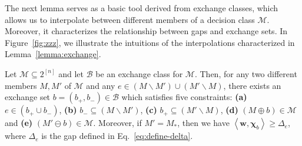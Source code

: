 \documentclass{article}
\newcommand{\M}{\mathcal M}
\newcommand{\B}{\mathcal B}
\newcommand{\del}{\backslash}
\newcommand{\inn}[1]{\left\langle #1 \right\rangle}
\renewcommand{\vec}[1]{\boldsymbol{#1}}
\begin{document}
The next lemma serves as a basic tool derived from exchange classes, which allows us to interpolate between different members of a decision class $\M$.
Moreover, it characterizes the relationship between gaps and exchange sets.
In Figure~\ref{fig:zzz}, we illustrate the intuitions of the interpolations characterized in Lemma~\ref{lemma:exchange}.
\begin{lemma}
\label{lemma:exchange}
Let $\M\subseteq 2^{[n]}$ and let $\B$ be an exchange class for $\M$.
Then, for any two different members $M,M'$ of $\M$ and any $e \in (M\del M')\cup(M'\del M)$, there exists an exchange set $b=(b_+,b_-) \in \B$ which satisfies five constraints: 
\textbf{(a)}
$e\in (b_+\cup b_-)$, \textbf{(b)} $b_-\subseteq (M\del M')$, \textbf{(c)} $b_+\subseteq (M'\del M)$, 
\textbf{(d)} $(M\oplus b) \in \M$ and \textbf{(e)} $(M'\ominus b) \in \M$.
Moreover, if $M' = M_*$, then we have $\inn{\vec w, \vec \chi_b} \ge \Delta_e$,
where $\Delta_e$ is the gap defined in Eq.~\eqref{eq:define-delta}.
\end{lemma}
\end{document}
